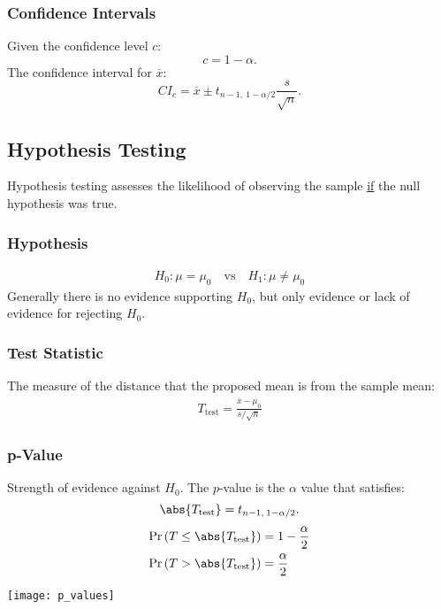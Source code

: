 \documentclass{article}
\begin{document}
\begin{minipage}{126.1962963mm}
    \begin{multicols*}{2}
        \subsubsection*{Confidence Intervals}
        Given the confidence level $c$:
        \begin{equation*}
            c = 1 - \alpha.
        \end{equation*}
        The confidence interval for $\overline{x}$:
        \begin{equation*}
            {CI}_{c} = \overline{x} \pm t_{n-1,\: 1-\alpha/2} \frac{s}{\sqrt{n}}.
        \end{equation*}
        \subsection*{Hypothesis Testing}
        Hypothesis testing assesses the likelihood of observing the sample \underline{if} the null hypothesis was true.
        \subsubsection*{Hypothesis}
        \begin{align*}
            H_0:\mu = \mu_0 \quad \text{vs} \quad H_1:\mu \neq \mu_0
        \end{align*}
        Generally there is no evidence supporting $H_0$, but only evidence or lack of evidence for rejecting $H_0$.
        \subsubsection*{Test Statistic}
        The measure of the distance that the proposed mean is from the sample mean:
        \begin{align*}
            T_{\text{test}} = \frac{\overline{x} - \mu_0}{s/\sqrt{n}}
        \end{align*}
        \subsubsection*{p-Value}
        Strength of evidence against $H_0$. The $p$-value is the $\alpha$ value that satisfies:
        \begin{equation*}
            \abs{T_{\text{test}}} = t_{n-1,\: 1-\alpha/2}.
        \end{equation*}
        \begin{align*}
            \Pr{\left( T \leq \abs{T_{\text{test}}} \right)} & = 1 - \frac{\alpha}{2} \\
            \Pr{\left( T > \abs{T_{\text{test}}} \right)}    & = \frac{\alpha}{2}
        \end{align*}
    \end{multicols*}
    \texttt{[image: p\_values]}
\end{minipage}
\end{document}
